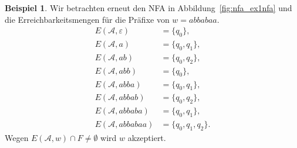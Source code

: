 \documentclass[11pt, a4paper]{article}
\theoremstyle{definition}
\newtheorem{example}[definition]{Beispiel}
\theoremstyle{plain}
\numberwithin{equation}{section}
\begin{document}
\begin{example}
	Wir betrachten erneut den NFA in Abbildung~\ref{fig:nfa_ex1nfa} und die Erreichbarkeitsmengen für die Präfixe von \( w = abbabaa \).
	\begin{align*}
		E(\mathcal{A}, \varepsilon) &= \{ q_0 \},\\
		E(\mathcal{A}, a) &= \{ q_0, q_1 \},\\
		E(\mathcal{A}, ab) &= \{ q_0, q_2 \},\\
		E(\mathcal{A}, abb) &= \{ q_0 \},\\
		E(\mathcal{A}, abba) &= \{ q_0, q_1 \},\\
		E(\mathcal{A}, abbab) &= \{ q_0, q_2 \},\\
		E(\mathcal{A}, abbaba) &= \{ q_0, q_1 \},\\
		E(\mathcal{A}, abbabaa) &= \{ q_0, q_1, q_2 \}.
	\end{align*}
	Wegen \( E(\mathcal{A}, w) \cap F \neq \emptyset \) wird \( w \) akzeptiert.
\end{example}
\end{document}
